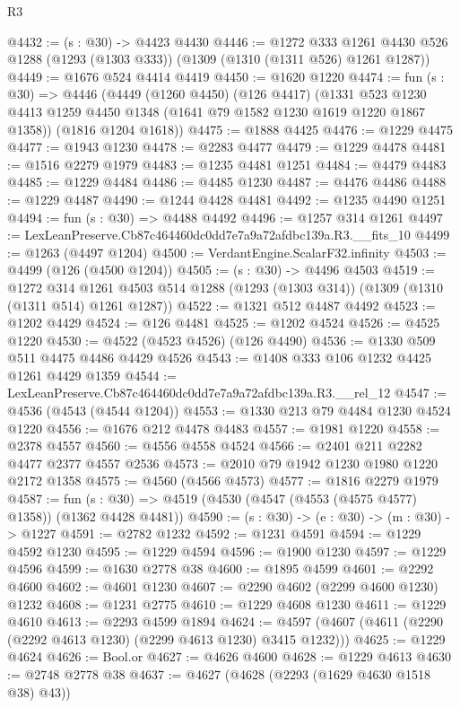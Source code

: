 \begin{lexlean}{R3}
\begin{coremodule}
@4432 := (s : @30) -> @4423 @4430
@4446 := @1272
    @333
    @1261
    @4430
    @526
    @1288
    (@1293 (@1303 @333))
    (@1309 (@1310 (@1311 @526) @1261 @1287))
@4449 := @1676 @524 @4414 @4419
@4450 := @1620 @1220
@4474 := fun (s : @30) =>
  @4446
    (@4449
      (@1260 @4450)
      (@126 @4417)
      (@1331 @523 @1230 @4413 @1259 @4450 @1348 (@1641 @79 @1582 @1230 @1619 @1220 @1867 @1358))
      (@1816 @1204 @1618))
@4475 := @1888 @4425
@4476 := @1229 @4475
@4477 := @1943 @1230
@4478 := @2283 @4477
@4479 := @1229 @4478
@4481 := @1516 @2279 @1979
@4483 := @1235 @4481 @1251
@4484 := @4479 @4483
@4485 := @1229 @4484
@4486 := @4485 @1230
@4487 := @4476 @4486
@4488 := @1229 @4487
@4490 := @1244 @4428 @4481
@4492 := @1235 @4490 @1251
@4494 := fun (s : @30) => @4488 @4492
@4496 := @1257 @314 @1261
@4497 := LexLeanPreserve.Cb87c464460dc0dd7e7a9a72afdbc139a.R3.__fits_10
@4499 := @1263 (@4497 @1204)
@4500 := VerdantEngine.ScalarF32.infinity
@4503 := @4499 (@126 (@4500 @1204))
@4505 := (s : @30) -> @4496 @4503
@4519 := @1272
    @314
    @1261
    @4503
    @514
    @1288
    (@1293 (@1303 @314))
    (@1309 (@1310 (@1311 @514) @1261 @1287))
@4522 := @1321 @512 @4487 @4492
@4523 := @1202 @4429
@4524 := @126 @4481
@4525 := @1202 @4524
@4526 := @4525 @1220
@4530 := @4522 (@4523 @4526) (@126 @4490)
@4536 := @1330 @509 @511 @4475 @4486 @4429 @4526
@4543 := @1408 @333 @106 @1232 @4425 @1261 @4429 @1359
@4544 := LexLeanPreserve.Cb87c464460dc0dd7e7a9a72afdbc139a.R3.__rel_12
@4547 := @4536 (@4543 (@4544 @1204))
@4553 := @1330 @213 @79 @4484 @1230 @4524 @1220
@4556 := @1676 @212 @4478 @4483
@4557 := @1981 @1220
@4558 := @2378 @4557
@4560 := @4556 @4558 @4524
@4566 := @2401 @211 @2282 @4477 @2377 @4557 @2536
@4573 := @2010 @79 @1942 @1230 @1980 @1220 @2172 @1358
@4575 := @4560 (@4566 @4573)
@4577 := @1816 @2279 @1979
@4587 := fun (s : @30) => @4519 (@4530 (@4547 (@4553 (@4575 @4577) @1358)) (@1362 @4428 @4481))
@4590 := (s : @30) -> (e : @30) -> (m : @30) -> @1227
@4591 := @2782 @1232
@4592 := @1231 @4591
@4594 := @1229 @4592 @1230
@4595 := @1229 @4594
@4596 := @1900 @1230
@4597 := @1229 @4596
@4599 := @1630 @2778 @38
@4600 := @1895 @4599
@4601 := @2292 @4600
@4602 := @4601 @1230
@4607 := @2290 @4602 (@2299 @4600 @1230) @1232
@4608 := @1231 @2775
@4610 := @1229 @4608 @1230
@4611 := @1229 @4610
@4613 := @2293 @4599 @1894
@4624 := @4597 (@4607 (@4611 (@2290 (@2292 @4613 @1230) (@2299 @4613 @1230) @3415 @1232)))
@4625 := @1229 @4624
@4626 := Bool.or
@4627 := @4626 @4600
@4628 := @1229 @4613
@4630 := @2748 @2778 @38
@4637 := @4627 (@4628 (@2293 (@1629 @4630 @1518 @38) @43))

\end{coremodule}
\end{lexlean}
